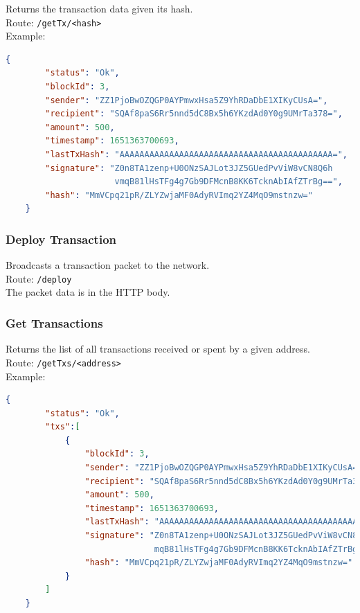 \documentclass[../documentation.tex]{subfiles}
\begin{document}
Returns the transaction data given its hash.
\\
Route: \texttt{/getTx/<hash>}
\\
Example:
\begin{lstlisting}[language=json]
    {
        "status": "Ok",
        "blockId": 3,
        "sender": "ZZ1PjoBwOZQGP0AYPmwxHsa5Z9YhRDaDbE1XIKyCUsA=",
        "recipient": "SQAf8paS6Rr5nnd5dC8Bx5h6YKzdAd0Y0g9UMrTa378=",
        "amount": 500,
        "timestamp": 1651363700693,
        "lastTxHash": "AAAAAAAAAAAAAAAAAAAAAAAAAAAAAAAAAAAAAAAAAAA=",
        "signature": "Z0n8TA1zenp+U0ONzSAJLot3JZ5GUedPvViW8vCN8Q6h
                      vmqB81lHsTFg4g7Gb9DFMcnB8KK6TcknAbIAfZTrBg==",
        "hash": "MmVCpq21pR/ZLYZwjaMF0AdyRVImq2YZ4MqO9mstnzw="
    }
\end{lstlisting}

\subsubsection{Deploy Transaction}

Broadcasts a transaction packet to the network.
\\
Route: \texttt{/deploy}
\\
The packet data is in the HTTP body.

\subsubsection{Get Transactions}

Returns the list of all transactions received or spent by a given address.
\\
Route: \texttt{/getTxs/<address>}
\\
Example:
\begin{lstlisting}[language=json]
    {
        "status": "Ok",
        "txs":[
            {
                "blockId": 3,
                "sender": "ZZ1PjoBwOZQGP0AYPmwxHsa5Z9YhRDaDbE1XIKyCUsA=",
                "recipient": "SQAf8paS6Rr5nnd5dC8Bx5h6YKzdAd0Y0g9UMrTa378=",
                "amount": 500,
                "timestamp": 1651363700693,
                "lastTxHash": "AAAAAAAAAAAAAAAAAAAAAAAAAAAAAAAAAAAAAAAAAAA=",
                "signature": "Z0n8TA1zenp+U0ONzSAJLot3JZ5GUedPvViW8vCN8Q6hv
                              mqB81lHsTFg4g7Gb9DFMcnB8KK6TcknAbIAfZTrBg==",
                "hash": "MmVCpq21pR/ZLYZwjaMF0AdyRVImq2YZ4MqO9mstnzw="
            }
        ]
    }
\end{lstlisting}

\pagebreak
\end{document}
